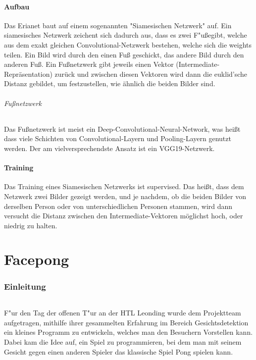 \documentclass[12pt]{article}
\begin{document}
\subsection{Aufbau}
\label{neuralfoot}
Das Erianet baut auf einem sogenannten "Siamesischen Netzwerk" auf.
Ein siamesisches Netzwerk zeichent sich dadurch aus, dass es zwei
\glqq{}F"uße\grqq gibt, welche aus dem exakt gleichen Convolutional-Netzwerk 
bestehen, welche sich die weights teilen. Ein Bild wird durch den
einen Fuß geschickt, das andere Bild durch den anderen Fuß.
Ein Fußnetzwerk gibt jeweils einen Vektor (Intermediate-Repräsentation)
zurück und zwischen diesen Vektoren wird dann die euklid'sche Distanz
gebildet, um festzustellen, wie ähnlich die beiden Bilder sind.
\paragraph{Fußnetzwerk}
Das Fußnetzwerk ist meist ein Deep-Convolutional-Neural-Network, was heißt
dass viele Schichten von Convolutional-Layern und Pooling-Layern genutzt werden.
Der am vielversprechendste Ansatz ist ein VGG19-Netzwerk.
\subsection{Training}
Das Training eines Siamesischen Netzwerks ist supervised. Das heißt, dass
dem Netzwerk zwei Bilder gezeigt werden, und je nachdem, ob die beiden Bilder
von derselben Person oder von unterschiedlichen Personen stammen, wird dann 
versucht die Distanz zwischen den Intermediate-Vektoren möglichst hoch, oder 
niedrig zu halten.

\part{Facepong}
\section{Einleitung}
\paragraph{}
F"ur den Tag der offenen T"ur an der HTL Leonding wurde dem Projektteam
aufgetragen, mithilfe ihrer gesammelten Erfahrung im Bereich Gesichtsdetektion
ein kleines Programm zu entwickeln, welches man den Besuchern Vorstellen kann.
Dabei kam die Idee auf, ein Spiel zu programmieren, bei dem man mit seinem Gesicht
gegen einen anderen Spieler das klassische Spiel \glqq Pong\grqq{} spielen kann.
\end{document}
